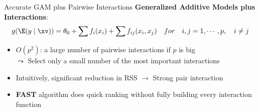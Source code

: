 \documentclass[11pt,compress,t,notes=noshow, aspectratio=169, xcolor=table]{beamer}
\begin{document}
\begin{frame}{Accurate GAM plus Pairwise Interactions}
\textbf{Generalized Additive Models plus Interactions}: $$g(\E (y \mid \xv)) = \theta_0 + \sum f_i(x_i) + \sum f_{ij}(x_i,x_j)\quad for\quad i,j=1,\cdots,p,\quad i\neq j$$
\begin{itemize}
    \item $O(p^2)$: a large number of pairwise interactions if $p$ is big\\
    $\leadsto$ Select only a small number of the most important interactions
    \item Intuitively, significant reduction in RSS $\to$ Strong pair interaction
    \item \textbf{FAST} algorithm does quick ranking without fully building every interaction function
\end{itemize}
\end{frame}
\end{document}
